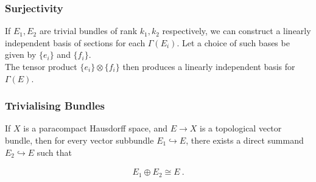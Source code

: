 \begin{frame}
    \frametitle{Surjectivity}


    If \(E_1, E_2\) are trivial bundles of rank \(k_1, k_2\) respectively, we
    can construct a linearly independent basis of sections for each
    \(\Gamma(E_i)\). Let a choice of such bases be given by \(\{e_i\}\) and
    \(\{f_i\}\). \\

    The tensor product \(\{e_i\} \otimes \{f_i\}\) then produces a linearly
    independent basis for \(\Gamma(E)\). 



\end{frame}

\begin{frame}
    \frametitle{Trivialising Bundles}

    \begin{theorem}
        If \(X\) is a paracompact Hausdorff space, and \(E \to X\) is a
        topological vector bundle, then for every vector subbundle \(E_1
        \hookrightarrow E\), there exists a direct summand \(E_2 \hookrightarrow
        E\) such that 

        \begin{gather*}
            E_1 \oplus E_2 \cong E~.
        \end{gather*}

    \end{theorem}

\end{frame}

